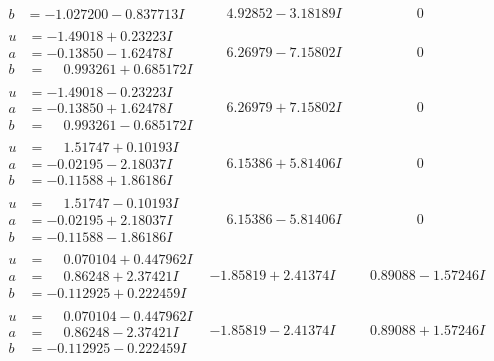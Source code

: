 \documentclass[1p]{elsarticle_modified}
\theoremstyle{definition}
\begin{document}
$$\begin{array}{c|c|c}
\begin{aligned}
b &= -1.027200 - 0.837713 I\end{aligned}
 & \phantom{-}4.92852 - 3.18189 I & \phantom{-0.000000 } 0 \\ \hline\begin{aligned}
u &= -1.49018 + 0.23223 I \\
a &= -0.13850 - 1.62478 I \\
b &= \phantom{-}0.993261 + 0.685172 I\end{aligned}
 & \phantom{-}6.26979 - 7.15802 I & \phantom{-0.000000 } 0 \\ \hline\begin{aligned}
u &= -1.49018 - 0.23223 I \\
a &= -0.13850 + 1.62478 I \\
b &= \phantom{-}0.993261 - 0.685172 I\end{aligned}
 & \phantom{-}6.26979 + 7.15802 I & \phantom{-0.000000 } 0 \\ \hline\begin{aligned}
u &= \phantom{-}1.51747 + 0.10193 I \\
a &= -0.02195 - 2.18037 I \\
b &= -0.11588 + 1.86186 I\end{aligned}
 & \phantom{-}6.15386 + 5.81406 I & \phantom{-0.000000 } 0 \\ \hline\begin{aligned}
u &= \phantom{-}1.51747 - 0.10193 I \\
a &= -0.02195 + 2.18037 I \\
b &= -0.11588 - 1.86186 I\end{aligned}
 & \phantom{-}6.15386 - 5.81406 I & \phantom{-0.000000 } 0 \\ \hline\begin{aligned}
u &= \phantom{-}0.070104 + 0.447962 I \\
a &= \phantom{-}0.86248 + 2.37421 I \\
b &= -0.112925 + 0.222459 I\end{aligned}
 & -1.85819 + 2.41374 I & \phantom{-}0.89088 - 1.57246 I \\ \hline\begin{aligned}
u &= \phantom{-}0.070104 - 0.447962 I \\
a &= \phantom{-}0.86248 - 2.37421 I \\
b &= -0.112925 - 0.222459 I\end{aligned}
 & -1.85819 - 2.41374 I & \phantom{-}0.89088 + 1.57246 I \\ \hline\begin{aligned}

\end{aligned}
\end{array}$$
\end{document}

